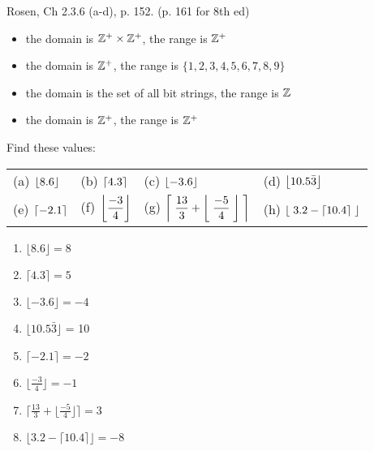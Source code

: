 \begin{questions}
 Rosen, Ch 2.3.6 (a-d), p. 152. (p. 161 for 8th ed)
   \ifprintanswers
        \vspace{-15pt}
   \fi
	\begin{solution}
	\begin{itemize}[itemsep=0pt,parsep=0pt,topsep=0pt,partopsep=0pt]
	    \item[(a)] the domain is $\mathbb{Z}^+ \times \mathbb{Z}^+$, the range is $\mathbb{Z}^+$
	    \item[(b)] the domain is $\mathbb{Z}^+$, the range is $\{1, 2, 3, 4, 5, 6, 7, 8,
	9\}$
		\item[(c)] the domain is the set of all bit strings, the range is $\mathbb{Z}$
	    \item[(d)] the domain is $\mathbb{Z}^+$, the range is $\mathbb{Z}^+$
	\end{itemize}
	\end{solution}




 Find these values:
\ifprintanswers
	\vspace{-10pt}
\else

\renewcommand{\arraystretch}{1.3}
\begin{tabular}{llll}
	(a) $\displaystyle \left\lfloor 8.6 \right\rfloor$ & (b) $\displaystyle \left\lceil 4.3 \right\rceil$ & 
	 (c) $\displaystyle \left\lfloor -3.6 \right\rfloor$  & (d) $\displaystyle \left\lfloor 10.5\bar{3} \right\rfloor $\\
	(e) $\displaystyle \left\lceil -2.1 \right\rceil$  & (f) $\displaystyle \left\lfloor \frac{-3}{4} \right\rfloor$ & 
	 (g) $\displaystyle \left\lceil \;\frac{13}{3}  + \left\lfloor \;\frac{-5}{4}\; \right\rfloor \; \right\rceil$ &
	 (h) $\displaystyle \left\lfloor \;3.2 - \left\lceil 10.4 \right\rceil \; \right\rfloor $\\
\end{tabular}
\fi
\begin{solution}
	\vspace{-5pt}
	\begin{enumerate}[label=(\alph*),itemsep=3pt,parsep=0pt,topsep=0pt,partopsep=0pt]
		\item $\lfloor 8.6 \rfloor = 8$
		\item $\lceil 4.3 \rceil = 5$
		\item $\lfloor -3.6 \rfloor = -4$
		\item $\lfloor 10.5\bar{3} \rfloor $ = 10
		\item $\lceil -2.1 \rceil = -2$
		\item $\lfloor \frac{-3}{4} \rfloor = -1$ 
		\item $\lceil \frac{13}{3} + \lfloor \frac{-5}{4} \rfloor \rceil = 3$
		\item $\lfloor 3.2 - \lceil 10.4 \rceil \rfloor = -8$
	\end{enumerate}
\end{solution}


\end{questions}
